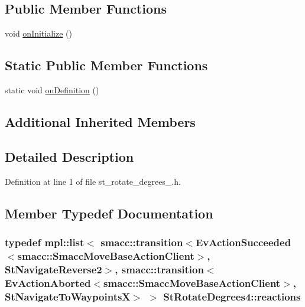 \subsection*{Public Member Functions}
\begin{DoxyCompactItemize}
\item 
void \hyperlink{structStRotateDegrees4_a25d516dde465ddfedc3a875fd93b9f47}{on\+Initialize} ()
\end{DoxyCompactItemize}
\subsection*{Static Public Member Functions}
\begin{DoxyCompactItemize}
\item 
static void \hyperlink{structStRotateDegrees4_a7a48915b131de32dc273376c9d3522ac}{on\+Definition} ()
\end{DoxyCompactItemize}
\subsection*{Additional Inherited Members}


\subsection{Detailed Description}


Definition at line 1 of file st\+\_\+rotate\+\_\+degrees\+\_.\+h.



\subsection{Member Typedef Documentation}
\subsubsection[{\texorpdfstring{reactions}{reactions}}]{\setlength{\rightskip}{0pt plus 5cm}typedef mpl\+::list$<$ {\bf smacc\+::transition}$<$Ev\+Action\+Succeeded$<${\bf smacc\+::\+Smacc\+Move\+Base\+Action\+Client}$>$, {\bf St\+Navigate\+Reverse2}$>$, {\bf smacc\+::transition}$<$Ev\+Action\+Aborted$<${\bf smacc\+::\+Smacc\+Move\+Base\+Action\+Client}$>$, {\bf St\+Navigate\+To\+WaypointsX}$>$ $>$ {\bf St\+Rotate\+Degrees4\+::reactions}}\hypertarget{structStRotateDegrees4_a810ef3b1574c44f31fa9b848c248dce0}{}\label{structStRotateDegrees4_a810ef3b1574c44f31fa9b848c248dce0}


